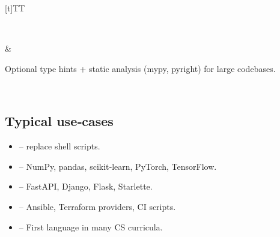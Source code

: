 \documentclass[a4paper,11pt,english]{sphinxmanual}
\begin{document}
\begin{savenotes}
\begin{tabulary}{\linewidth}[t]{TT}
\begin{varwidth}[t]{}
\sphinxbeforeendvarwidth
\end{varwidth}%
\\
\sphinxhline\begin{varwidth}[t]{}
\sphinxAtStartPar
{}
\sphinxbeforeendvarwidth
\end{varwidth}%
&\begin{varwidth}[t]{}
\sphinxAtStartPar
Optional type hints + static analysis (mypy, pyright) for large codebases.
\sphinxbeforeendvarwidth
\end{varwidth}%
\\
\sphinxbottomrule
\end{tabulary}
\sphinxtableafterendhook\par
\sphinxattableend\end{savenotes}


\subsection{Typical use‑cases}
\label{\detokenize{getting_started/why_python:typical-usecases}}\begin{itemize}
\item {} 
\sphinxAtStartPar
{} – replace shell scripts.

\item {} 
\sphinxAtStartPar
{} – NumPy, pandas, scikit‑learn, PyTorch, TensorFlow.

\item {} 
\sphinxAtStartPar
{} – FastAPI, Django, Flask, Starlette.

\item {} 
\sphinxAtStartPar
{} – Ansible, Terraform providers, CI scripts.

\item {} 
\sphinxAtStartPar
{} – First language in many CS curricula.

\end{itemize}
\end{document}
